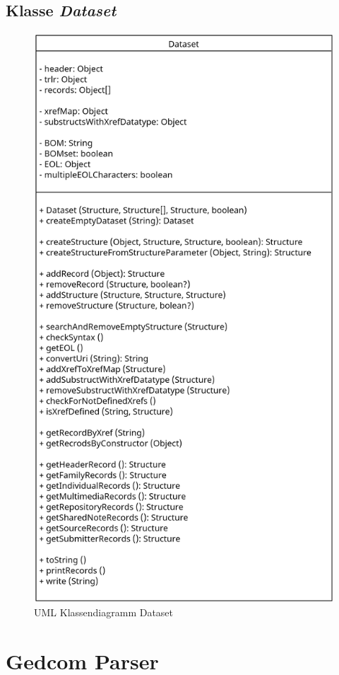 \subsection{Klasse \textit{Dataset}}
\label{subsec: Implementierung - Gedcom Struktur - Klasse Dataset}
\begin{figure}[h]
	\centering
	\includegraphics[width=1\textwidth]{images/UML_Class_Dataset.png}
	\caption{UML Klassendiagramm Dataset}
	\label{fig: UML Klassendiagramm Dataset}
\end{figure}


\section{Gedcom Parser}
\label{sec: Implementierung - Gedcom Parser}


